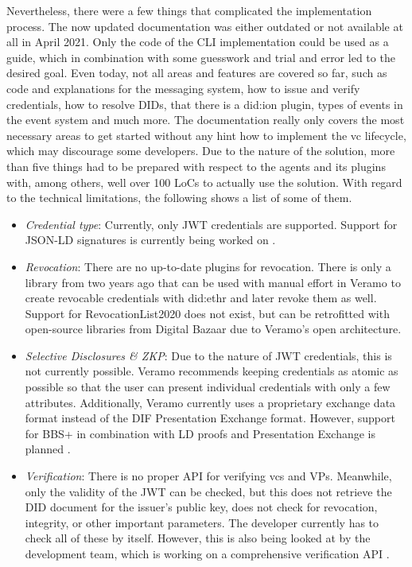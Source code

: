         Nevertheless, there were a few things that complicated the implementation process. The now updated documentation was either outdated or not available at all in April 2021. Only the code of the \ac{CLI} implementation could be used as a guide, which in combination with some guesswork and trial and error led to the desired goal. Even today, not all areas and features are covered so far, such as code and explanations for the messaging system, how to issue and verify credentials, how to resolve \acp{DID}, that there is a did:ion plugin, types of events in the event system and much more. The documentation really only covers the most necessary areas to get started without any hint how to implement the \ac{vc} lifecycle, which may discourage some developers. Due to the nature of the solution, more than five things had to be prepared with respect to the agents and its plugins with, among others, well over 100 LoCs to actually use the solution. With regard to the technical limitations, the following shows a list of some of them.
    
\begin{itemize}
    \item \textit{Credential type}: Currently, only JWT credentials are supported. Support for JSON-LD signatures is currently being worked on \cite{terbu_tracking_2021}.
    \item \textit{Revocation}: There are no up-to-date plugins for revocation. There is only a library from two years ago that can be used with manual effort in Veramo to create revocable credentials with did:ethr and later revoke them as well. Support for RevocationList2020 does not exist, but can be retrofitted with open-source libraries from Digital Bazaar due to Veramo's open architecture.
    \item \textit{Selective Disclosures \& \ac{ZKP}}: Due to the nature of JWT credentials, this is not currently possible. Veramo recommends keeping credentials as atomic as possible so that the user can present individual credentials with only a few attributes. Additionally, Veramo currently uses a proprietary exchange data format instead of the \ac{DIF} Presentation Exchange format. However, support for BBS+ in combination with LD proofs and Presentation Exchange is planned \cite{terbu_tracking_2021}.
    \item \textit{Verification}: There is no proper API for verifying \acp{vc} and \acp{VP}. Meanwhile, only the validity of the JWT can be checked, but this does not retrieve the \ac{DID} document for the issuer's public key, does not check for revocation, integrity, or other important parameters. The developer currently has to check all of these by itself. However, this is also being looked at by the development team, which is working on a comprehensive verification API \cite{riedel_generalized_2021}.
\end{itemize}

